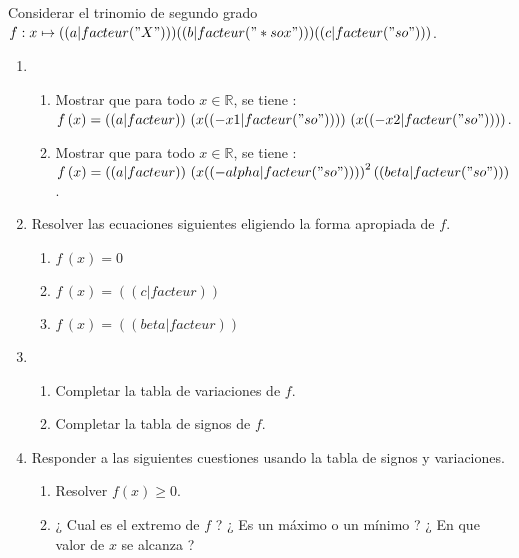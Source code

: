 \exercice
Considerar el trinomio de segundo grado $f: x\mapsto (( a|facteur("X") )) (( b|facteur("*sox") )) (( c|facteur("so") ))$.

\begin{enumerate}
\item
\begin{enumerate}
    \item Mostrar que para todo $x\in\mathbb{R}$, se tiene : $f\,(x)=(( a|facteur )) \,\left( x (( -x1|facteur("so") )) \right) \, \left( x (( -x2|facteur("so") )) \right) $.
    \item Mostrar que para todo $x\in\mathbb{R}$, se tiene : $f\,(x)=(( a|facteur )) \,\left( x (( -alpha|facteur("so") )) \right)^2 (( beta|facteur("so") ))$.
\end{enumerate}
\item Resolver las ecuaciones siguientes eligiendo la forma apropiada de $f$.
\begin{enumerate}
\item $f\,(x)=0$
\item $f\,(x)=(( c|facteur ))$
\item $f\,(x)=(( beta|facteur ))$
\end{enumerate}
\item
\begin{enumerate}
\item Completar la tabla de variaciones de $f$.
\item Completar la tabla de signos de $f$.
\end{enumerate}
\item Responder a las siguientes cuestiones usando la tabla de signos y variaciones.
\begin{enumerate}
\item Resolver $f(x)\geqslant0$.
\item ¿ Cual es el extremo de $f$ ? ¿ Es un máximo o un mínimo ? ¿ En que valor de $x$ se alcanza ?
\end{enumerate}
\end{enumerate}

